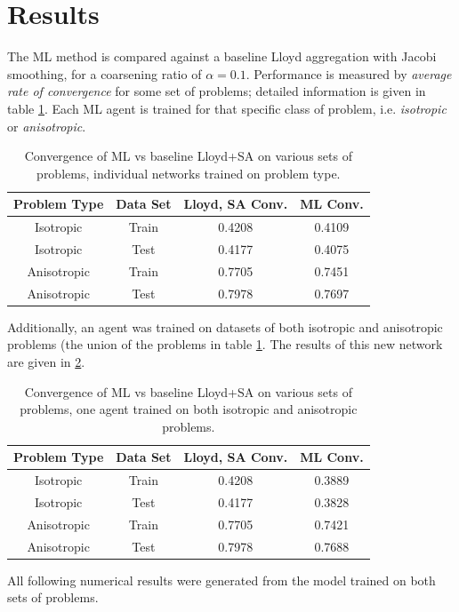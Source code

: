 \documentclass{article}
\begin{document}
\section{Results}
The ML method is compared against a baseline Lloyd aggregation with Jacobi smoothing, for a coarsening ratio of $\alpha=0.1$.  Performance is measured by \textit{average rate of convergence} for some set of problems; detailed information is given in table \ref{tab:conv}.  Each ML agent is trained for that specific class of problem, i.e. \textit{isotropic} or \textit{anisotropic}.
\begin{table}[h]
  \centering
  \begin{tabular}{c c c c}
    \textbf{Problem Type} & \textbf{Data Set} & \textbf{Lloyd, SA Conv.} & \textbf{ML Conv.} \\
    \hline
    Isotropic & Train & 0.4208 & 0.4109 \\
    Isotropic & Test & 0.4177 & 0.4075 \\
    Anisotropic & Train & 0.7705 & 0.7451 \\
    Anisotropic & Test & 0.7978 & 0.7697 \\
    \hline
  \end{tabular}
  \caption{Convergence of ML vs baseline Lloyd+SA on various sets of problems, individual networks trained on problem type.}
  \label{tab:conv}
\end{table}
\FloatBarrier

Additionally, an agent was trained on datasets of both isotropic and anisotropic problems (the union of the problems in table \ref{tab:conv}.  The results of this new network are given in \ref{tab:conv_all}.
\begin{table}[h]
  \centering
  \begin{tabular}{c c c c}
    \textbf{Problem Type} & \textbf{Data Set} & \textbf{Lloyd, SA Conv.} & \textbf{ML Conv.} \\
    \hline
    Isotropic & Train & 0.4208 & 0.3889 \\
    Isotropic & Test & 0.4177 & 0.3828 \\
    Anisotropic & Train & 0.7705 & 0.7421 \\
    Anisotropic & Test & 0.7978 & 0.7688 \\
    \hline
  \end{tabular}
  \caption{Convergence of ML vs baseline Lloyd+SA on various sets of problems, one agent trained on both isotropic and anisotropic problems.}
  \label{tab:conv_all}
\end{table}
\FloatBarrier
All following numerical results were generated from the model trained on both sets of problems.
\end{document}
